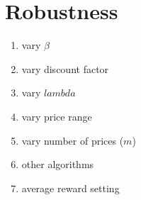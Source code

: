 \section{Robustness}

\begin{enumerate}
	\item vary $\beta$
	\item vary discount factor
	\item vary $lambda$
	\item vary price range
	\item vary number of prices ($m$)
	\item other algorithms
	\item average reward setting
\end{enumerate}

\pagebreak